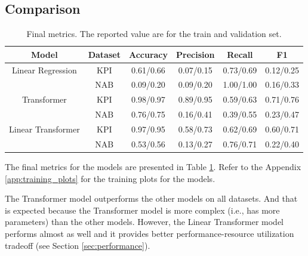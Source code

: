 \documentclass[a4paper, twoside]{report}
\theoremstyle{definition}
\numberwithin{equation}{section}
\begin{document}
\subsection{Comparison}


\begin{table}[h!]
    \centering
    \begin{tabular}{|c|c|c|c|c|c|}
        \hline
        Model              & Dataset & Accuracy  & Precision & Recall    & F1        \\
        \hline
        Linear Regression  & KPI     & 0.61/0.66 & 0.07/0.15 & 0.73/0.69 & 0.12/0.25 \\
                           & NAB     & 0.09/0.20 & 0.09/0.20 & 1.00/1.00 & 0.16/0.33 \\
        \hline
        Transformer        & KPI     & 0.98/0.97 & 0.89/0.95 & 0.59/0.63 & 0.71/0.76 \\
                           & NAB     & 0.76/0.75 & 0.16/0.41 & 0.39/0.55 & 0.23/0.47 \\
        \hline
        Linear Transformer & KPI     & 0.97/0.95 & 0.58/0.73 & 0.62/0.69 & 0.60/0.71 \\
                           & NAB     & 0.53/0.56 & 0.13/0.27 & 0.76/0.71 & 0.22/0.40 \\
        \hline
    \end{tabular}
    \caption{Final metrics. The reported value are for the train and validation set.}
    \label{tab:final_metrics}
\end{table}

The final metrics for the models are presented in Table \ref{tab:final_metrics}.
Refer to the Appendix \ref{app:training_plots} for the training plots for the models.

The Transformer model outperforms the other models on all datasets. And that
is expected because the Transformer model is more complex (i.e., has more parameters)
than the other models. However, the Linear Transformer model performs almost as well
and it provides better performance-resource utilization tradeoff (see Section \ref{sec:performance}).
\end{document}
